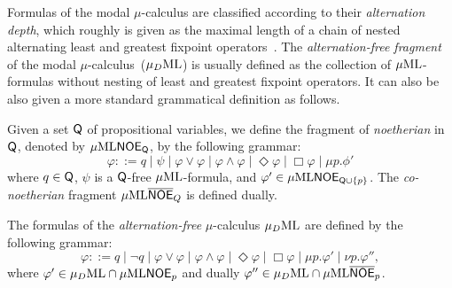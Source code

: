 \bigskip
Formulas of the modal $\mu$-calculus are classified according to their
\emph{alternation depth}, which roughly is given as the maximal length of
a chain of nested alternating least and greatest fixpoint operators~\cite{Niwinski86}.
The \emph{alternation-free fragment} of the modal $\mu$-calculus~($\mu_{D}\mathrm{ML}$) is usually defined as the collection of
$\mu\mathrm{ML}$-formulas without nesting of least and greatest fixpoint operators. It can also be also given a more standard grammatical definition as follows.

Given a set $\mathsf{Q}$ of propositional variables, we define the fragment of \MC \emph{noetherian} in $\mathsf{Q}$, denoted by $\mu\mathrm{ML}\mathsf{NOE}_{\mathsf{Q}}$,
by the following 
grammar:
\begin{equation*}
   \varphi ::= q
   \mid \psi
   \mid \varphi \lor \varphi
   \mid \varphi \land \varphi
     \mid \Diamond \varphi
       \mid \Box \varphi
   \mid \mu p.\phi'
\end{equation*}
where $q \in \mathsf{Q}$, $\psi$ is a $\mathsf{Q}$-free $\mu\mathrm{ML}$-formula, and 
$\varphi' \in \mu\mathrm{ML}\mathsf{NOE}_{\mathsf{Q}\cup\{p\}}$. 
The \emph{co-noetherian} fragment $\mu\mathrm{ML}\overline{\mathsf{NOE}}_{Q}$ is defined dually.

\begin{definition}
The formulas of the \emph{alternation-free} $\mu$-calculus $\mu_{D}\mathrm{ML}$ 
are defined by the following grammar:
\begin{equation*}
   \varphi ::= 
      q \mid \neg q 
   \mid \varphi\lor\varphi \mid \varphi\land\varphi 
      \mid \Diamond \varphi
       \mid \Box \varphi
   \mid \mu p. \varphi'    
   \mid \nu p. \varphi'',
\end{equation*} 
where 
$\varphi' \in \mu_{D}\mathrm{ML} \cap \mu\mathrm{ML}\mathsf{NOE}_{p}$
and dually $\varphi'' \in \mu_{D}\mathrm{ML} \cap \mu\mathrm{ML}\overline{\mathsf{NOE}}_{p}$.
\end{definition}

